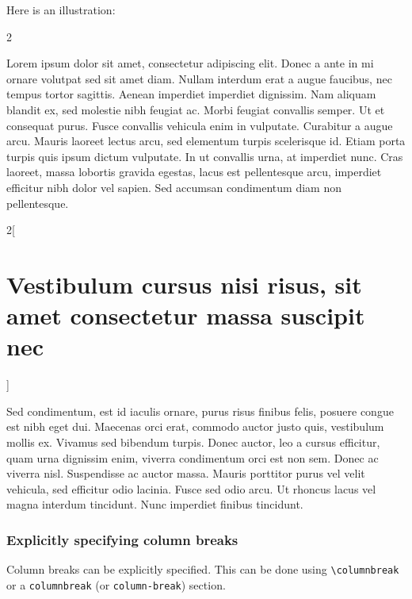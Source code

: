 \documentclass[
]{article}
\begin{document}
Here is an illustration:

{\raggedcolumns\setlength{\columnseprule}{ 1pt}
\renewcommand{\columnseprulecolor}{\color{black}}
\begin{multicols}{2}

Lorem ipsum dolor sit amet, consectetur adipiscing elit. Donec a ante in
mi ornare volutpat sed sit amet diam. Nullam interdum erat a augue
faucibus, nec tempus tortor sagittis. Aenean imperdiet imperdiet
dignissim. Nam aliquam blandit ex, sed molestie nibh feugiat ac. Morbi
feugiat convallis semper. Ut et consequat purus. Fusce convallis
vehicula enim in vulputate. Curabitur a augue arcu. Mauris laoreet
lectus arcu, sed elementum turpis scelerisque id. Etiam porta turpis
quis ipsum dictum vulputate. In ut convallis urna, at imperdiet nunc.
Cras laoreet, massa lobortis gravida egestas, lacus est pellentesque
arcu, imperdiet efficitur nibh dolor vel sapien. Sed accumsan
condimentum diam non pellentesque.

\end{multicols}
\begin{multicols}{2}[\hypertarget{vestibulum-cursus-nisi-risus-sit-amet-consectetur-massa-suscipit-nec}{%
\section{Vestibulum cursus nisi risus, sit amet consectetur massa
suscipit
nec}\label{vestibulum-cursus-nisi-risus-sit-amet-consectetur-massa-suscipit-nec}}]

Sed condimentum, est id iaculis ornare, purus risus finibus felis,
posuere congue est nibh eget dui. Maecenas orci erat, commodo auctor
justo quis, vestibulum mollis ex. Vivamus sed bibendum turpis. Donec
auctor, leo a cursus efficitur, quam urna dignissim enim, viverra
condimentum orci est non sem. Donec ac viverra nisl. Suspendisse ac
auctor massa. Mauris porttitor purus vel velit vehicula, sed efficitur
odio lacinia. Fusce sed odio arcu. Ut rhoncus lacus vel magna interdum
tincidunt. Nunc imperdiet finibus tincidunt.

\end{multicols}
}

\hypertarget{explicitly-specifying-column-breaks}{%
\subsubsection{Explicitly specifying column
breaks}\label{explicitly-specifying-column-breaks}}

Column breaks can be explicitly specified. This can be done using
\texttt{\textbackslash{}columnbreak} or a \texttt{columnbreak} (or
\texttt{column-break}) section.
\end{document}
